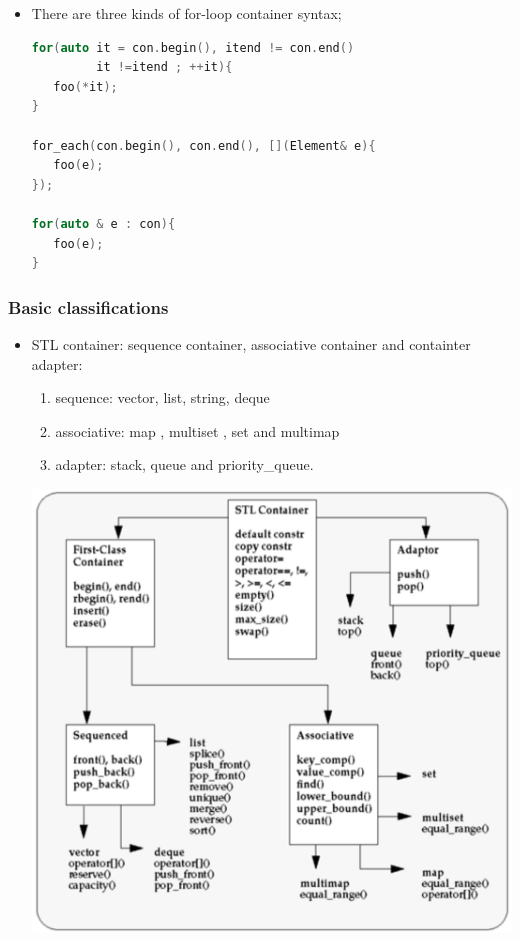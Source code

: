 \documentclass[a4paper,12pt,twoside]{book}
\begin{document}
\begin{itemize}
\item There are three kinds of for-loop container syntax;
\begin{lstlisting}[frame=single, language=c++]
for(auto it = con.begin(), itend != con.end()
         it !=itend ; ++it){
   foo(*it);
}

for_each(con.begin(), con.end(), [](Element& e){
   foo(e);
});

for(auto & e : con){
   foo(e);
}
\end{lstlisting}

\end{itemize}


\subsubsection{Basic classifications}
\begin{itemize}

\item STL container: sequence container, associative container and containter adapter:
\begin{enumerate}
\item sequence: vector, list, string,  deque
\item associative: map , multiset , set and multimap
\item  adapter: stack, queue and priority\_queue.
\end{enumerate}

\includegraphics[scale=0.6]{pics/container.png}


\end{itemize}
\end{document}
